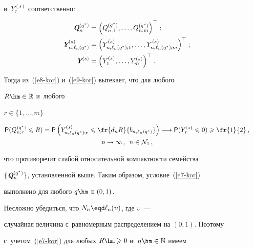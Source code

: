 и~$Y_r^{(s)}$ соответственно:


\begin{align*}


\vQ_n^{(q^*)}&=\left(Q_{n;1}^{(q^*)},\ldots ,Q_{n;m}^{(q^*)}\right)^{\top}\,;\


\\


\vY_{n,\ell_n(q^*)}^{(s)}&=\left(Y_{n,\ell_n(q^*);1}^{(s)},\ldots ,Y_{n,\ell_n(q^*);m}^{(s)}\right)^{\top}\,;


\\


 \vY^{(s)}&=\left(Y_1^{(s)},\ldots ,Y_m^{(s)}\right)^{\top}\,.


\end{align*}


Тогда из~(\ref{e8-kor}) и~(\ref{e9-kor}) вытекает, что для любого


$R\hm\in\mathbb{R}$ и~любого


$r\in\{1,\ldots ,m\}$


\begin{multline*}


{\sf P}(Q_{n;r}^{(q^*)}\leqslant R)={\sf


P}\left(Y_{n,\ell_n(q^*);r}^{(s)}\leqslant\fr{d_nR}{b_{n,\ell_n(q^*)}}\right)


\longrightarrow


{\sf P}(Y_r^{(s)}\leqslant 0)\geqslant \fr{1}{2}\,,\\ n\to\infty\,,\enskip


n\in\mathcal{N}_1\,,


\end{multline*}


что противоречит слабой относительной компактности семейства


$\{\emph{\textbf{Q}}_n^{(q^*)}\}$, установленной выше. Таким образом, условие~(\ref{e7-kor})


выполнено для любого $q\hm\in(0,1)$.





Несложно убедиться, что $N_n\eqd\ell_n(\upsilon)$, где $\upsilon$~---


случайная величина с~равномерным распределением на $(0,1)$. Поэтому


с~учетом~(\ref{e7-kor}) для любых $R\hm\geqslant0$ и~$n\hm\in\mathbb{N}$ имеем





\vspace*{-2pt}





